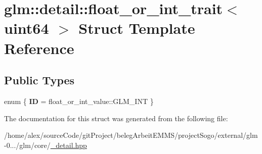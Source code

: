 \hypertarget{structglm_1_1detail_1_1float__or__int__trait_3_01uint64_01_4}{\section{glm\-:\-:detail\-:\-:float\-\_\-or\-\_\-int\-\_\-trait$<$ uint64 $>$ Struct Template Reference}
\label{structglm_1_1detail_1_1float__or__int__trait_3_01uint64_01_4}
}
\subsection*{Public Types}
\begin{DoxyCompactItemize}
\item 
enum \{ {\bfseries I\-D} = float\-\_\-or\-\_\-int\-\_\-value\-:\-:G\-L\-M\-\_\-\-I\-N\-T
 \}
\end{DoxyCompactItemize}


The documentation for this struct was generated from the following file\-:\begin{DoxyCompactItemize}
\item 
/home/alex/source\-Code/git\-Project/beleg\-Arbeit\-E\-M\-M\-S/project\-Sogo/external/glm-\/0.../glm/core/\hyperlink{__detail_8hpp}{\-\_\-detail.\-hpp}\end{DoxyCompactItemize}
